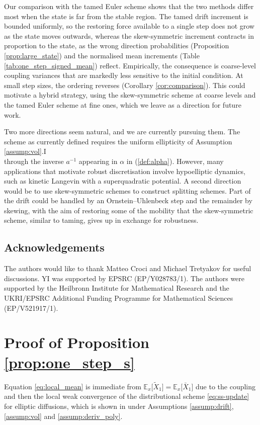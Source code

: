 \documentclass[11pt]{article}
\begin{document}
Our comparison with the tamed Euler scheme shows that the two methods differ most when the state is far from the stable region. The tamed drift increment is bounded uniformly, so the restoring force available to a single step does not grow as the state moves outwards, whereas the skew-symmetric increment contracts in proportion to the state, as the wrong direction probabilities (Proposition \ref{prop:large_state}) and the normalised mean increments (Table \ref{tab:one_step_signed_mean}) reflect. Empirically, the consequence is coarse-level coupling variances that are markedly less sensitive to the initial condition. At small step sizes, the ordering reverses (Corollary \ref{cor:comparison}). This could motivate a hybrid strategy, using the skew-symmetric scheme at coarse levels and the tamed Euler scheme at fine ones, which we leave as a direction for future work.

Two more directions seem natural, and we are currently pursuing them. The scheme as currently defined requires the uniform ellipticity of Assumption \ref{assump:vol}.I \\
through the inverse $a^{-1}$ appearing in $\alpha$ in (\ref{def:alpha}). However, many applications that motivate robust discretisation involve hypoelliptic dynamics, such as kinetic Langevin with a superquadratic potential. A second direction would be to use skew-symmetric schemes to construct splitting schemes. Part of the drift could be handled by an Ornstein--Uhlenbeck step and the remainder by skewing, with the aim of restoring some of the mobility that the skew-symmetric scheme,  similar to taming, gives up in exchange for robustness.


\subsection*{Acknowledgements} The authors would like to thank Matteo Croci and 
Michael Tretyakov for useful discussions. YI was supported by EPSRC 
(EP/Y028783/1). The authors were supported by the Heilbronn Institute for Mathematical Research and the UKRI/EPSRC Additional Funding Programme for Mathematical Sciences (EP/V521917/1).

\appendix
\section{Proof of Proposition \ref{prop:one_step_s}} \label{sec:pf_prop}

Equation \eqref{eq:local_mean} is immediate from $\mathbb{E}_x  \bigl[ \widetilde{X}_1 \bigr] = \mathbb{E}_x \bigl[ \bar{X}_1 \bigr]$ due to the coupling and then the local weak convergence of the distributional scheme \eqref{eq:ss-update} for elliptic diffusions, which is shown in \cite[Proposition 3.1]{skew:ima} under Assumptions \ref{assump:drift}, \ref{assump:vol} and \ref{assump:deriv_poly}. 
\end{document}
